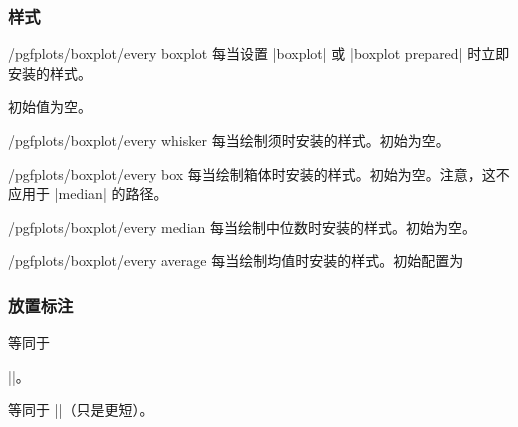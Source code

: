 \subsubsection{样式}

\begin{stylekey}{/pgfplots/boxplot/every boxplot}
    每当设置 |boxplot| 或 |boxplot prepared| 时立即安装的样式。

    初始值为空。
\end{stylekey}

\begin{stylekey}{/pgfplots/boxplot/every whisker}
    每当绘制须时安装的样式。初始为空。
\end{stylekey}

\begin{stylekey}{/pgfplots/boxplot/every box}
    每当绘制箱体时安装的样式。初始为空。注意，这不应用于 |median| 的路径。
\end{stylekey}

\begin{stylekey}{/pgfplots/boxplot/every median}
    每当绘制中位数时安装的样式。初始为空。
\end{stylekey}

\begin{stylekey}{/pgfplots/boxplot/every average}
    每当绘制均值时安装的样式。初始配置为
\begin{codeexample}
\end{codeexample}
\end{stylekey}


\subsubsection{放置标注}

\begin{command}{\pgfplotsboxplotvalue{}}
    等同于

    ||。
\end{command}

\begin{command}{\boxplotvalue{}}
    等同于 |\pgfplotsboxplotvalue|（只是更短）。
\end{command}

